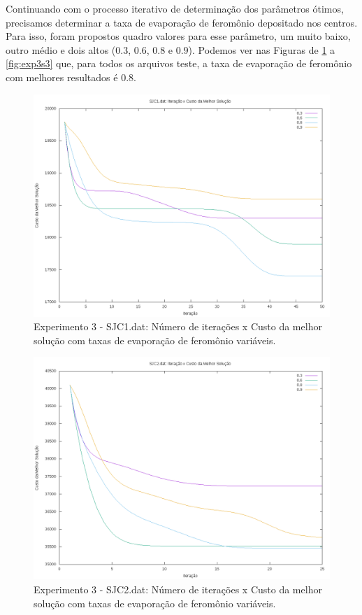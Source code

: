 \documentclass[12pt]{article}
\begin{document}
Continuando com o processo iterativo de determinação dos parâmetros ótimos, precisamos determinar a taxa de
evaporação de feromônio depositado nos centros. Para isso, foram propostos quadro valores para esse parâmetro,
um muito baixo, outro médio e dois altos ($0.3$, $0.6$, $0.8$ e $0.9$). Podemos ver nas Figuras de \ref{fig:exp3s1}
a \ref{fig:exp3s3} que, para todos os arquivos teste, a taxa de evaporação de feromônio com melhores resultados
é $ 0.8 $.

\begin{figure}[!htbp]
  \centering
  \includegraphics[width=1\textwidth]{exp3s1.png}
  \caption{Experimento 3 - SJC1.dat: Número de iterações x Custo da melhor solução com taxas
  de evaporação de feromônio variáveis.}
  \label{fig:exp3s1}
\end{figure}

\begin{figure}[!htbp]
  \centering
  \includegraphics[width=1\textwidth]{exp3s2.png}
  \caption{Experimento 3 - SJC2.dat: Número de iterações x Custo da melhor solução com taxas
  de evaporação de feromônio variáveis.}
  \label{fig:exp3s2}
\end{figure}
\end{document}
